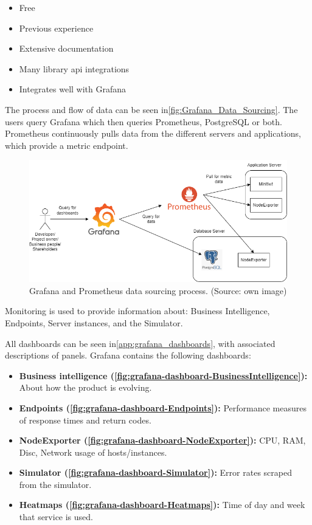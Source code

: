 \begin{itemize}
    \item Free
    \item Previous experience
    \item Extensive documentation 
    \item Many library \gls{api} integrations
    \item Integrates well with Grafana
\end{itemize} 

The process and flow of data can be seen in\autoref{fig:Grafana_Data_Sourcing}. The users query Grafana which then queries Prometheus, PostgreSQL or both. Prometheus continuously pulls data from the different servers and applications, which provide a metric endpoint. 

\begin{figure}[!ht]
    \centering
    \captionsetup{justification=centering,margin=1cm}
    \includegraphics[width=120mm]{images/monitoring/MetricDataPulling.png}
    \caption{Grafana and Prometheus data sourcing process. (Source: own image)}
    \label{fig:Grafana_Data_Sourcing}
\end{figure}


Monitoring is used to provide information about: Business Intelligence, Endpoints, Server instances, and the Simulator. 

All dashboards can be seen in\autoref{app:grafana_dashboards}, with associated descriptions of panels. Grafana contains the following dashboards:

\begin{itemize}
    \item \textbf{Business intelligence (\autoref{fig:grafana-dashboard-BusinessIntelligence}):} About how the product is evolving.
    \item \textbf{Endpoints (\autoref{fig:grafana-dashboard-Endpoints}):} Performance measures of response times and return codes.
    \item \textbf{NodeExporter (\autoref{fig:grafana-dashboard-NodeExporter}):} CPU, RAM, Disc, Network usage of hosts/instances.
    \item \textbf{Simulator (\autoref{fig:grafana-dashboard-Simulator}):} Error rates scraped from the simulator.
    \item \textbf{Heatmaps (\autoref{fig:grafana-dashboard-Heatmaps}):} Time of day and week that service is used.
\end{itemize}

